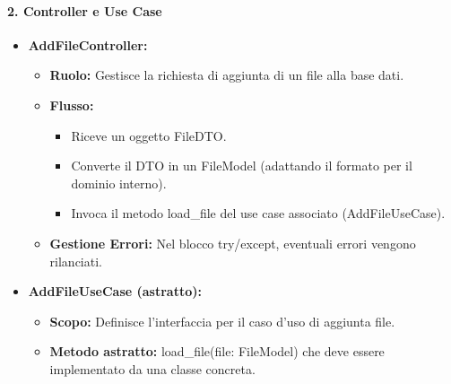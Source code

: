     \paragraph{2. Controller e Use Case}
    \begin{itemize}
        \item \textbf{AddFileController:}
        \begin{itemize}
            \item \textbf{Ruolo:} Gestisce la richiesta di aggiunta di un file alla base dati.
            \item \textbf{Flusso:}
            \begin{itemize}
                \item Riceve un oggetto FileDTO.
                \item Converte il DTO in un FileModel (adattando il formato per il dominio interno).
                \item Invoca il metodo load\_file del use case associato (AddFileUseCase).
            \end{itemize}
            \item \textbf{Gestione Errori:} Nel blocco try/except, eventuali errori vengono rilanciati.
        \end{itemize}
        \item \textbf{AddFileUseCase (astratto):}
        \begin{itemize}
            \item \textbf{Scopo:} Definisce l’interfaccia per il caso d’uso di aggiunta file.
            \item \textbf{Metodo astratto:} load\_file(file: FileModel) che deve essere implementato da una classe concreta.
        \end{itemize}
    \end{itemize}

